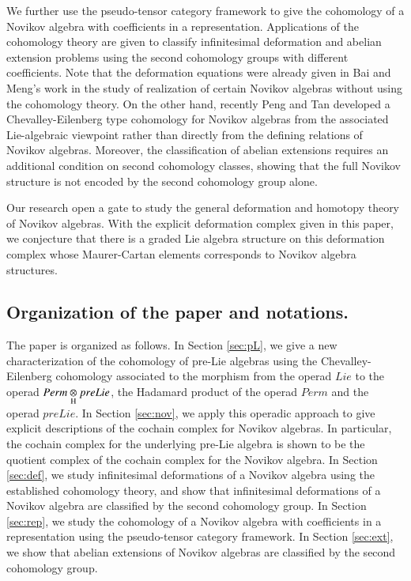 \documentclass[12pt]{amsart}
\theoremstyle{definition}
\newcommand{\ot}{\otimes}
\begin{document}
We further use the pseudo-tensor category framework to give the cohomology of a Novikov algebra with coefficients in a representation. Applications of the cohomology theory are given to classify infinitesimal deformation and abelian extension problems using the second cohomology groups with different coefficients.  Note that the deformation equations were already given in Bai and Meng's work \cite{BaiM2} in the study of realization of certain Novikov algebras without using the cohomology theory.  On the other hand,
 recently Peng and Tan developed a Chevalley-Eilenberg type cohomology for Novikov algebras \cite{PT2024} from the associated Lie-algebraic viewpoint rather than directly from the defining relations of Novikov algebras. Moreover, the classification of abelian extensions requires an additional condition on second cohomology classes, showing that the full Novikov structure is not encoded by the second cohomology group alone.

 Our research open a gate to study the general deformation and homotopy theory of Novikov algebras. With the explicit deformation complex given in this paper, we conjecture that there is a graded Lie algebra structure on this deformation complex whose Maurer-Cartan elements corresponds to Novikov algebra structures.




\subsection{Organization of the paper and notations.} The paper is organized as follows. In Section \ref{sec:pL}, we give a new characterization of the cohomology of pre-Lie algebras using the Chevalley-Eilenberg cohomology associated to the morphism from the operad $Lie$ to the operad $Perm\underset{\rm H}{\ot} preLie$, the Hadamard product of the operad $Perm$ and the operad $preLie$. In Section \ref{sec:nov}, we apply this operadic approach to give explicit descriptions of the cochain complex for Novikov algebras. In particular, the cochain complex for the underlying pre-Lie algebra is shown to be the quotient complex of the cochain complex for the Novikov algebra. In Section \ref{sec:def}, we study infinitesimal deformations of a Novikov algebra using the established cohomology theory, and show that infinitesimal deformations of a Novikov algebra are classified by the second cohomology group. In Section \ref{sec:rep}, we study the cohomology of a Novikov algebra with coefficients in a representation using the pseudo-tensor category framework. In Section \ref{sec:ext}, we show that abelian extensions of Novikov algebras are classified by the second cohomology group.
\end{document}
